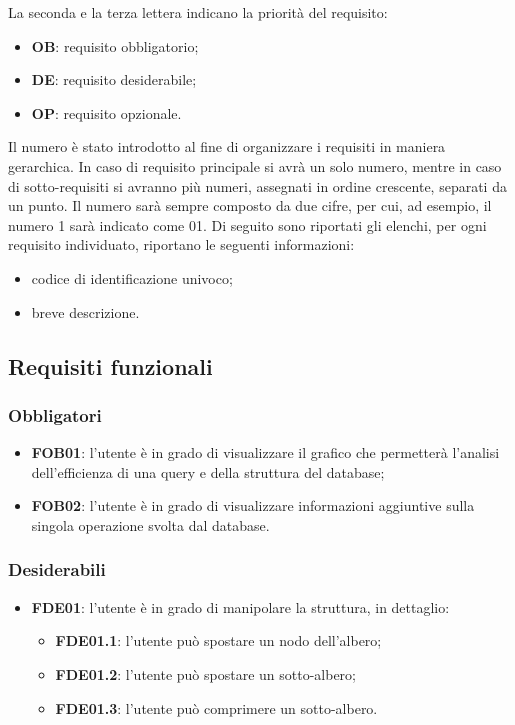La seconda e la terza lettera indicano la priorità del requisito:
\begin{itemize}
\item \textbf{OB}: requisito obbligatorio;
\item \textbf{DE}: requisito desiderabile;
\item \textbf{OP}: requisito opzionale.
\end{itemize}
Il numero è stato introdotto al fine di organizzare i requisiti in maniera gerarchica. In caso
di requisito principale si avrà un solo numero, mentre in caso di sotto-requisiti si avranno più
numeri, assegnati in ordine crescente, separati da un punto. Il numero sarà sempre composto da due cifre, per cui, ad esempio, il numero 1 sarà indicato come 01.
Di seguito sono riportati gli elenchi, per ogni requisito individuato, riportano le seguenti
informazioni:
\begin{itemize}
\item codice di identificazione univoco;
\item breve descrizione.
\end{itemize}
\subsection{Requisiti funzionali}
\subsubsection{Obbligatori}
\begin{itemize}
\item \textbf{FOB01}: l'utente è in grado di visualizzare il grafico che permetterà l'analisi dell'efficienza di una query e della struttura del database;
\item \textbf{FOB02}: l'utente è in grado di visualizzare informazioni aggiuntive sulla singola operazione svolta dal database.
\end{itemize}
\subsubsection{Desiderabili}
\begin{itemize}
\item \textbf{FDE01}: l'utente è in grado di manipolare la struttura, in dettaglio:
	\begin{itemize}
	\item \textbf{FDE01.1}: l'utente può spostare un nodo dell'albero;
	\item \textbf{FDE01.2}: l'utente può spostare un sotto-albero;
	\item \textbf{FDE01.3}: l'utente può comprimere un sotto-albero.
	\end{itemize}
\end{itemize}
